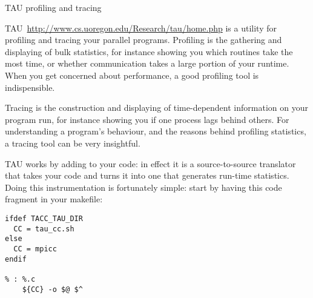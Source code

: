  {TAU profiling and tracing}

TAU~\url{http://www.cs.uoregon.edu/Research/tau/home.php} is a utility
for profiling and tracing your parallel programs. Profiling is the
gathering and displaying of bulk statistics, for instance showing you
which routines take the most time, or whether communication takes a
large portion of your runtime. When you get concerned about
performance, a good profiling tool is indispensible.

Tracing is the construction and displaying of time-dependent
information on  your program run, for instance showing you if one
process lags behind others. For understanding a program's behaviour,
and the reasons behind profiling statistics, a tracing tool can be
very insightful.

TAU works by adding  to your code: in
effect it is a source-to-source translator that takes your code and
turns it into one that generates run-time statistics. Doing this
instrumentation is fortunately simple: start by having this code
fragment in your makefile:
\begin{verbatim}
ifdef TACC_TAU_DIR
  CC = tau_cc.sh
else
  CC = mpicc
endif

% : %.c
	${CC} -o $@ $^
\end{verbatim}
